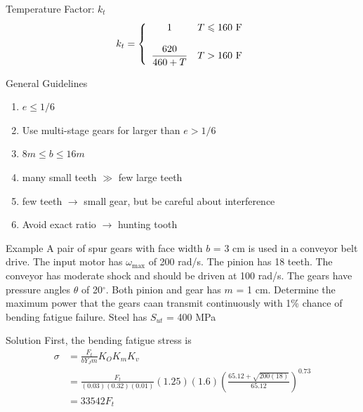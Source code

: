 \documentclass[
10pt,
a4paper,
openany,
svgnames,
]{book}
\begin{document}
\begin{frame}{Temperature Factor: $k_{t}$}
  \begin{align*}
    k_{t} = \left\{
    \begin{array}{cl}
      1 & T \leqslant 160 \text{ F} \\
      \hspace{5mm} \\
      \dfrac{620}{460 + T} & T > 160 \text{ F}
    \end{array}
    \right.
  \end{align*}
\end{frame}

\begin{frame}{General Guidelines}
  \linespread{2}
  \begin{enumerate}
    \item $e \leqslant 1/6$
    \item Use multi-stage gears for larger than $e > 1/6$
    \item $8m \leqslant b \leq 16m$
    \item many small teeth $\gg$ few large teeth
    \item few teeth $\rightarrow$ small gear, but be careful about interference
    \item Avoid exact ratio $\rightarrow$ hunting tooth
  \end{enumerate}
\end{frame}


\begin{frame}{Example}
  A pair of spur gears with face width $b$ = 3 cm is used in a conveyor belt drive. The input motor has $\omega_{\max}$ of 200 rad/s. The pinion has 18 teeth. The conveyor has moderate shock and should be driven at 100 rad/s. The gears have pressure angles $\theta$ of 20$^{\circ}$. Both pinion and gear has $m$ = 1 cm. Determine the maximum power that the gears caan transmit continuously with 1\% chance of bending fatigue failure. Steel has $S_{ut}$ = 400 MPa
\end{frame}

\begin{frame}{Solution}
  First, the bending fatigue stress is
  \begin{align*}
    \sigma &= \frac{F_{t}}{bY_{J}m} K_{O}K_{m}K_{v} \\
           &= \frac{F_{t}}{(0.03)(0.32)(0.01)} (1.25)(1.6) \left( \frac{65.12 + \sqrt{200(18)}}{65.12} \right)^{0.73} \\
           &= 33542 F_{t}
  \end{align*}
\end{frame}
\end{document}
